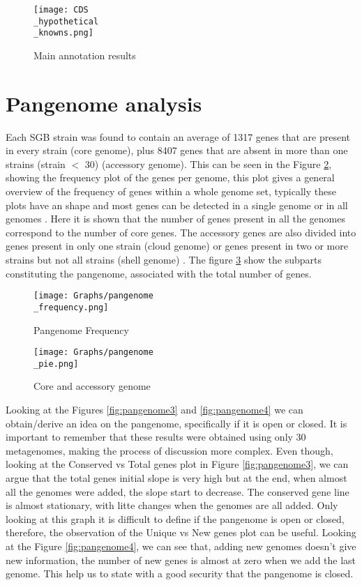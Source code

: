 \documentclass[a4paper,titlepage]{book}
\begin{document}
\begin{figure}[ht]
\centering
\texttt{[image: CDS\\\_hypothetical\\\_knowns.png]}
\caption{Main annotation results}
\label{fig:CDS}
\end{figure}

\section{Pangenome analysis}



Each SGB strain was found to contain an average of 1317 genes that are present in every strain (core genome), plus 8407 genes that are absent in more than one strains (strain $<$ 30) (accessory genome). This can be seen in the Figure \ref{fig:pangenome2}, showing the frequency plot of the genes per genome, this plot gives a general overview of the frequency of genes within a whole genome set, typically these plots have an shape and most genes can be detected in a single genome or in all genomes \cite{Analysis-roary}. Here it is shown that the number of genes present in all the genomes correspond to the number of core genes.
The accessory genes are also divided into genes present in only one strain (cloud genome) or genes present in two or more strains but not all strains (shell genome) \cite{Medini}. The figure \ref{fig:pangenome1} show the subparts constituting the pangenome, associated with the total number of genes.



\begin{figure}[ht]
\centering
\texttt{[image: Graphs/pangenome\\\_frequency.png]}
\caption{Pangenome Frequency}
\label{fig:pangenome2}
\end{figure}

\begin{figure}[ht]
\centering
\texttt{[image: Graphs/pangenome\\\_pie.png]}
\caption{Core and accessory genome}
\label{fig:pangenome1}
\end{figure}


Looking at the Figures \ref{fig:pangenome3} and  \ref{fig:pangenome4} we can obtain/derive an idea on the pangenome, specifically if it is open or closed. It is important to remember that these results were obtained using only 30 metagenomes, making the process of discussion more complex. Even though, looking at the Conserved vs Total genes plot in Figure \ref{fig:pangenome3}, we can argue that the total genes initial slope is very high but at the end, when almost all the genomes were added, the slope start to decrease. The conserved gene line is almost stationary, with litte changes when the genomes are all added. Only looking at this graph it is difficult to define if the pangenome is open or closed, therefore, the observation of the Unique vs New genes plot can be useful. Looking at the Figure \ref{fig:pangenome4}, we can see that, adding new genomes doesn't give new information, the number of new genes is almost at zero when we add the last genome. This help us to state with a good security that the pangenome is closed.
\end{document}
